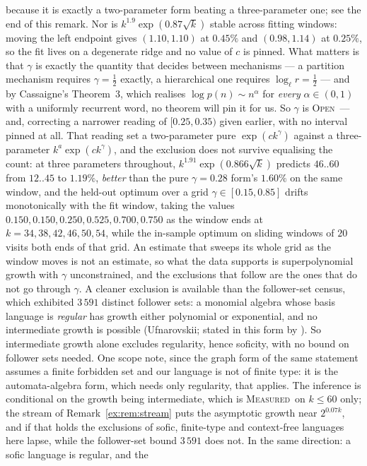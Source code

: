 \documentclass[11pt]{article}
\theoremstyle{definition}
\theoremstyle{remark}
\newcommand{\MEASURED}{\textsc{Measured}}
\newcommand{\OPEN}{\textsc{Open}}
\begin{document}
because it is exactly a two-parameter form beating a three-parameter one; see the end of this remark.
Nor is $k^{1.9}\exp(0.87\sqrt k)$ stable across
fitting windows: moving the left endpoint gives $(1.10,1.10)$ at $0.45\%$ and $(0.98,1.14)$ at
$0.25\%$, so the fit lives on a degenerate ridge and no value of $c$ is pinned. What matters is that
$\gamma$ is exactly the quantity that decides between mechanisms --- a partition mechanism requires
$\gamma=\tfrac12$ exactly, a hierarchical one requires $\log_\ell r=\tfrac12$ --- and by Cassaigne's
Theorem~3, which realises $\log p(n)\sim n^\alpha$ for \emph{every} $\alpha\in(0,1)$ with a uniformly
recurrent word, no theorem will pin it for us. So $\gamma$ is \OPEN\ --- and, correcting a narrower reading of $[0.25,0.35)$ given earlier, with no interval pinned at all. That reading set a two-parameter pure $\exp(ck^\gamma)$ against a three-parameter $k^{a}\exp(ck^\gamma)$, and the exclusion does not survive equalising the count: at three parameters throughout, $k^{1.91}\exp(0.866\sqrt k)$ predicts $46..60$ from $12..45$ to $1.19\%$, \emph{better} than the pure $\gamma=0.28$ form's $1.60\%$ on the same window, and the held-out optimum over a grid $\gamma\in[0.15,0.85]$ drifts monotonically with the fit window, taking the values $0.150,0.150,0.250,0.525,0.700,0.750$ as the window ends at $k=34,38,42,46,50,54$, while the in-sample optimum on sliding windows of $20$ visits both ends of that grid. An estimate that sweeps its whole grid as the window moves is not an estimate, so what the data supports is superpolynomial growth with $\gamma$ unconstrained, and the exclusions that follow are the ones that do not go through $\gamma$. A cleaner exclusion is available than the follower-set census, which exhibited $3\,591$ distinct
follower sets: a monomial algebra whose basis language is \emph{regular} has growth either polynomial
or exponential, and no intermediate growth is possible (Ufnarovskii; stated in this form by
\cite{BM10}). So intermediate growth alone excludes regularity, hence soficity, with no bound on
follower sets needed. One scope note, since the graph form of the same statement assumes a finite
forbidden set and our language is not of finite type: it is the automata-algebra form, which needs only
regularity, that applies. The inference is conditional on the growth being intermediate, which is
\MEASURED\ on $k\le60$ only; the stream of Remark~\ref{ex:rem:stream} puts the asymptotic growth near $2^{0.07k}$, and if that holds the exclusions of sofic, finite-type and context-free languages here lapse, while the follower-set bound $3\,591$ does not. In the same direction: a sofic language is regular, and the
\end{document}
